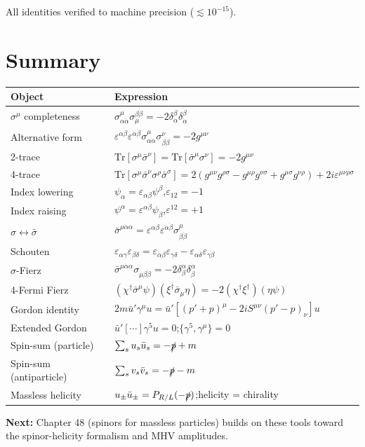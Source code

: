\documentclass[12pt]{article}
\begin{document}
All identities verified to machine precision ($\lesssim 10^{-15}$).

\section{Summary}

\begin{center}
\renewcommand{\arraystretch}{1.5}
\begin{tabular}{@{}ll@{}}
  \toprule
  Object & Expression \\
  \midrule
  $\sigma^\mu$ completeness & $\sigma^\mu_{\alpha\dot\alpha}\sigma_\mu^{\beta\dot\beta}=-2\delta_\alpha^\beta\delta_{\dot\alpha}^{\dot\beta}$ \\
  Alternative form & $\varepsilon^{\alpha\beta}\varepsilon^{\dot\alpha\dot\beta}\sigma^\mu_{\alpha\dot\alpha}\sigma^\nu_{\beta\dot\beta}=-2g^{\mu\nu}$ \\
  2-trace & $\mathrm{Tr}[\sigma^\mu\bar\sigma^\nu]=\mathrm{Tr}[\bar\sigma^\mu\sigma^\nu]=-2g^{\mu\nu}$ \\
  4-trace & $\mathrm{Tr}[\sigma^\mu\bar\sigma^\nu\sigma^\rho\bar\sigma^\sigma]=2(g^{\mu\nu}g^{\rho\sigma}-g^{\mu\rho}g^{\nu\sigma}+g^{\mu\sigma}g^{\nu\rho})+2i\varepsilon^{\mu\nu\rho\sigma}$ \\
  Index lowering & $\psi_\alpha=\varepsilon_{\alpha\beta}\psi^\beta$,\quad $\varepsilon_{12}=-1$ \\
  Index raising & $\psi^\alpha=\varepsilon^{\alpha\beta}\psi_\beta$,\quad $\varepsilon^{12}=+1$ \\
  $\sigma\leftrightarrow\bar\sigma$ & $\bar\sigma^{\mu\dot\alpha\alpha}=\varepsilon^{\alpha\beta}\varepsilon^{\dot\alpha\dot\beta}\sigma^\mu_{\beta\dot\beta}$ \\
  Schouten & $\varepsilon_{\alpha\gamma}\varepsilon_{\beta\delta}=\varepsilon_{\alpha\beta}\varepsilon_{\gamma\delta}-\varepsilon_{\alpha\delta}\varepsilon_{\gamma\beta}$ \\
  $\sigma$-Fierz & $\bar\sigma^{\mu\dot\alpha\alpha}\sigma_{\mu\beta\dot\beta}=-2\delta^\alpha_\beta\delta^{\dot\alpha}_{\dot\beta}$ \\
  4-Fermi Fierz & $(\chi^\dagger\bar\sigma^\mu\psi)(\xi^\dagger\bar\sigma_\mu\eta)=-2(\chi^\dagger\xi^\dagger)(\eta\psi)$ \\
  Gordon identity & $2m\bar u'\gamma^\mu u = \bar u'[(p'+p)^\mu - 2iS^{\mu\nu}(p'-p)_\nu]u$ \\
  Extended Gordon & $\bar u'[\cdots]\gamma^5 u = 0$;\quad $\{\gamma^5,\gamma^\mu\}=0$ \\
  Spin-sum (particle) & $\sum_s u_s\bar u_s = -\slashed{p}+m$ \\
  Spin-sum (antiparticle) & $\sum_s v_s\bar v_s = -\slashed{p}-m$ \\
  Massless helicity & $u_\pm\bar u_\pm = P_{R/L}(-\slashed{p})$;\quad helicity = chirality \\
  \bottomrule
\end{tabular}
\end{center}

\bigskip
\noindent\textbf{Next:} Chapter 48 (spinors for massless particles) builds
on these tools toward the spinor-helicity formalism and MHV amplitudes.
\end{document}
